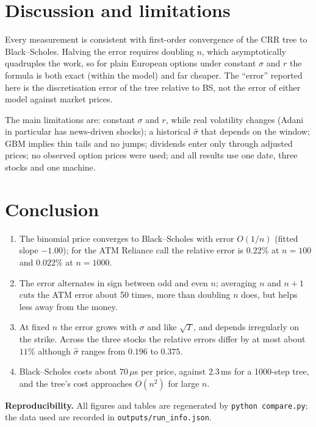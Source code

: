 \documentclass[10pt,a4paper]{article}
\begin{document}
\section{Discussion and limitations}
Every measurement is consistent with first-order convergence of the CRR tree to Black--Scholes. Halving the
error requires doubling $n$, which asymptotically quadruples the work, so for plain European options under
constant $\sigma$ and $r$ the formula is both exact (within the model) and far cheaper. The ``error'' reported here
is the discretisation error of the tree relative to BS, not the error of either model against market prices.

The main limitations are: constant $\sigma$ and $r$, while real volatility changes (Adani in particular
has news-driven shocks); a historical $\hat\sigma$ that depends on the window; GBM implies thin tails and no jumps; dividends enter only through adjusted prices;
no observed option prices were used; and all results use one date, three stocks and one machine.

\section{Conclusion}
\begin{enumerate}\setlength\itemsep{0pt}\setlength\topsep{2pt}
\item The binomial price converges to Black--Scholes with error $O(1/n)$ (fitted slope $-1.00$); for the ATM
Reliance call the relative error is $0.22\%$ at $n=100$ and $0.022\%$ at $n=1000$.
\item The error alternates in sign between odd and even $n$; averaging $n$ and $n+1$ cuts the ATM error about
50 times, more than doubling $n$ does, but helps less away from the money.
\item At fixed $n$ the error grows with $\sigma$ and like $\sqrt T$, and depends irregularly on the strike.
Across the three stocks the relative errors differ by at most about $11\%$ although $\hat\sigma$ ranges from
$0.196$ to $0.375$.
\item Black--Scholes costs about $70\,\mu$s per price, against $2.3$\,ms for a 1000-step tree, and the tree's
cost approaches $O(n^2)$ for large $n$.
\end{enumerate}
\noindent\textbf{Reproducibility.} All figures and tables are regenerated by \texttt{python compare.py};
the data used are recorded in \texttt{outputs/run\_info.json}.

\footnotesize

\end{document}

